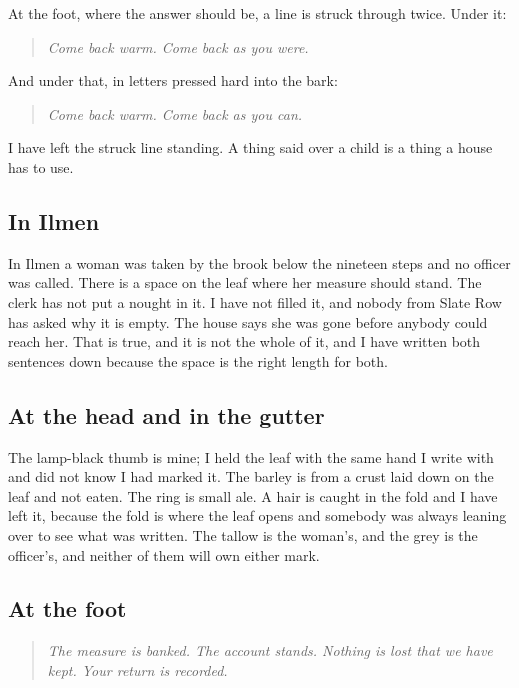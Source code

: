 \documentclass{design/chronicle}
\begin{document}
At the foot, where the answer should be, a line is struck through twice. Under it:

\begin{quote}\itshape Come back warm. Come back as you were.\end{quote}

And under that, in letters pressed hard into the bark:

\begin{quote}\itshape Come back warm. Come back as you can.\end{quote}

I have left the struck line standing. A thing said over a child is a thing a house has to use.

\subsection*{In Ilmen}

In Ilmen a woman was taken by the brook below the nineteen steps and no officer was called. There is a space on the leaf where her measure should stand. The clerk has not put a nought in it. I have not filled it, and nobody from Slate Row has asked why it is empty. The house says she was gone before anybody could reach her. That is true, and it is not the whole of it, and I have written both sentences down because the space is the right length for both.

\subsection*{At the head and in the gutter}

The lamp-black thumb is mine; I held the leaf with the same hand I write with and did not know I had marked it. The barley is from a crust laid down on the leaf and not eaten. The ring is small ale. A hair is caught in the fold and I have left it, because the fold is where the leaf opens and somebody was always leaning over to see what was written. The tallow is the woman’s, and the grey is the officer’s, and neither of them will own either mark.

\subsection*{At the foot}

\begin{quote}\itshape The measure is banked. The account stands. Nothing is lost that we have kept. Your return is recorded.\end{quote}
\end{document}
